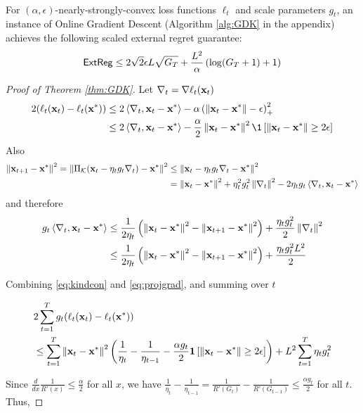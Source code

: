 \paragraph{}
    For $(\alpha,\epsilon)$-nearly-strongly-convex loss functions $\ell_t$ and scale parameters $g_t$, an instance of Online Gradient Descent (Algorithm \ref{alg:GDK} in the appendix) achieves the following scaled external regret guarantee:
\begin{align*}
    \mathsf{ExtReg} \leq 2\sqrt{2}\epsilon L\sqrt{G_T} + \frac{L^2}{\alpha}\left(\log(G_T+1)+1\right)
\end{align*}

\begin{proof}[Proof of Theorem \ref{thm:GDK}]
Let $\nabla_t = \nabla \ell_t(\mathbf{x}_t)$
    \begin{align}
        2(\lt(\xt)-\lt(\x^*)) &\leq 2\inp{\nabla_t, \xt-\x^*}-\alpha\p{\norm{\xt-\x^*}-\epsilon}_+^2 \nonumber\\
        &\leq 2\inp{\nabla_t, \xt-\x^*}-\frac{\alpha}{2}\norm{\xt-\x^*}^2 \1\ps{\norm{\xt-\x^*} \geq 2\epsilon} \label{eq:kindcon}
    \end{align}
Also
\begin{align*}
    \left\|\mathbf{x}_{t+1}-\mathbf{x}^*\right\|^2 = \left\|\Pi_{\mathcal{K}}(\mathbf{x}_t-\eta_t g_t\nabla_t)-\mathbf{x}^*\right\|^2 &\leq \left\|\mathbf{x}_t-\eta_t g_t\nabla_t-\mathbf{x}^*\right\|^2\\
    &=\left\|\mathbf{x}_t-\mathbf{x}^*\right\|^2+\eta_t^2g_t^2\left\|\nabla_t\right\|^2-2\eta_t g_t \left \langle \nabla_t,\mathbf{x}_t-\mathbf{x}^* \right \rangle
\end{align*}
and therefore
\begin{align}
    g_t\left \langle \nabla_t, \mathbf{x}_t-\mathbf{x}^* \right \rangle &\leq \frac{1}{2\eta_t}\left(\left\|\mathbf{x}_t-\mathbf{x}^*\right\|^2-\left\|\mathbf{x}_{t+1}-\mathbf{x}^*\right\|^2\right)+\frac{\eta_t g_t^2}{2} \left\|\nabla_t\right\|^2 \nonumber \\
    &\leq \frac{1}{2\eta_t}\left(\left\|\mathbf{x}_t-\mathbf{x}^*\right\|^2-\left\|\mathbf{x}_{t+1}-\mathbf{x}^*\right\|^2\right)+\frac{\eta_t g_t^2L^2}{2}\label{eq:projgrad}
\end{align}

Combining \eqref{eq:kindcon} and \eqref{eq:projgrad}, and summing over $t$

\begin{align*}
    &2\sum_{t=1}^T g_t(\ell_t(\mathbf{x}_t)-\ell_t(\mathbf{x}^*))\\
    &\leq \sum_{t=1}^T \left\|\mathbf{x}_t-\mathbf{x}^*\right\|^2 \left(\frac{1}{\eta_t}-\frac{1}{\eta_{t-1}} - \frac{\alpha g_t}{2}\mathbf{1}\left[\left\|\mathbf{x}_t-\mathbf{x}^*\right\| \geq 2 \epsilon\right]\right) + L^2\sum_{t=1}^T \eta_t g_t^2
\end{align*}

Since $\frac{d}{dx} \frac{1}{R'(x)} \leq \frac{\alpha}{2}$ for all $x$, we have $\frac{1}{\eta_t}-\frac{1}{\eta_{t-1}} = \frac{1}{R'(G_t)}-\frac{1}{R'(G_{t-1})} \leq \frac{\alpha g_t}{2}$ for all $t$.  Thus,


\end{proof}
